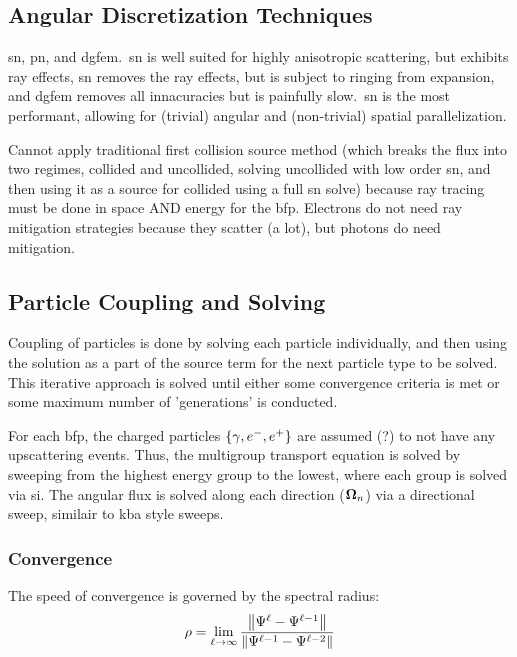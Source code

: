 \subsection{Angular Discretization Techniques}
\gls{sn}, \gls{pn}, and \gls{dgfem}.\ \gls{sn} is well suited for highly anisotropic scattering, but exhibits ray effects, \gls{sn} removes the ray effects, but is subject to ringing from expansion, and \gls{dgfem} removes all innacuracies but is painfully slow.\ \gls{sn} is the most performant, allowing for (trivial) angular and (non-trivial) spatial parallelization. 

Cannot apply traditional first collision source method (which breaks the flux into two regimes, collided and uncollided, solving uncollided with low order \gls{sn}, and then using it as a source for collided using a full \gls{sn} solve) because ray tracing must be done in space AND energy for the \gls{bfp}. Electrons do not need ray mitigation strategies because they scatter (a lot), but photons do need mitigation.

\subsection{Particle Coupling and Solving}
Coupling of particles is done by solving each particle individually, and then using the solution as a part of the source term for the next particle type to be solved. This iterative approach is solved until either some convergence criteria is met or some maximum number of 'generations' is conducted.

For each \gls{bfp}, the charged particles $\{\gamma, e^{-}, e^{+}\}$ are assumed (?) to not have any upscattering events. Thus, the multigroup transport equation is solved by sweeping from the highest energy group to the lowest, where each group is solved via \gls{si}. The angular flux is solved along each direction ($\bm{\Omega}_n$) via a directional sweep, similair to \gls{kba} style sweeps.

\subsubsection{Convergence}
The speed of convergence is governed by the spectral radius:
\begin{equation}
    \rho = \lim_{\ell\rightarrow\infty}
    \frac{
        \left\lVert\Psi^{\ell} - \Psi^{\ell-1}\right\rVert
    }
    {
        \left\lVert\Psi^{\ell-1} - \Psi^{\ell-2}\right\rVert
    }
\end{equation}

